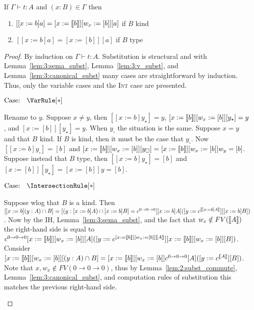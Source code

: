 \begin{lemma}
    \label{lem:3:subst}
    If $\Gamma \vdash t : A$ and $(x : B) \in \Gamma$ then
    \begin{enumerate}
        \item $[[x := b]a] = [x := \llbracket b \rrbracket][w_x := [b]][a]$ if $B$ kind
        \item $[[x := b]a] = [x := [b]][a]$ if $B$ type
    \end{enumerate}
\end{lemma}
\begin{proof}
    By induction on $\Gamma \vdash t : A$.
    Substitution is structural and with Lemma~\ref{lem:3:sema_subst}, Lemma~\ref{lem:3:v_subst}, and Lemma~\ref{lem:3:canonical_subst} many cases are straightforward by induction.
    Thus, only the variable cases and the \textsc{Int} case are presented.

    $\text{Case: }\begin{array}{c} \VarRule[*] \end{array}$
    \begin{proofcase}
        Rename to $y$.
        Suppose $x \neq y$, then $[[x := b]y_\star] = y$, $[x := \llbracket b \rrbracket][w_x := [b]][y_\star] = y$, and $[x := [b]][y_\star] = y$.
        When $y_\square$ the situation is the same.
        Suppose $x = y$ and that $B$ kind.
        If $B$ is kind, then it must be the case that $y_\square$.
        Now $[[x := b]y_\square] = [b]$ and  $[x := \llbracket b \rrbracket][w_x := [b]][y_\square] = [x := \llbracket b \rrbracket][w_x := [b]]w_y = [b]$.
        Suppose instead that $B$ type, then $[[x := b]y_\star] = [b]$ and $[x := [b]][y_\star] = [x := [b]]y = [b]$.
    \end{proofcase}

    $\text{Case: }\begin{array}{c} \IntersectionRule[*] \end{array}$
    \begin{proofcase}
        Suppose wlog that $B$ is a kind.
        Then $[[x := b](y : A) \cap B] = [(y : [x := b]A) \cap [x := b]B] = c^{0 \to 0 \to 0}[[x := b]A] ([y := c^{\llbracket [x := b]A \rrbracket}][[x := b]B])$.
        Now by the IH, Lemma~\ref{lem:3:sema_subst}, and the fact that $w_x \notin FV(\llbracket A \rrbracket)$ the right-hand side is equal to $c^{0 \to 0 \to 0}[x := \llbracket b \rrbracket][w_x := [b]][A] ([y := c^{[x := \llbracket b \rrbracket][w_x := [b]]\llbracket A \rrbracket}][x := \llbracket b \rrbracket][w_x := [b]][B])$.
        Consider $[x := \llbracket b \rrbracket][w_x := [b]][(y : A) \cap B] = [x := \llbracket b \rrbracket][w_x := [b]]c^{0 \to 0 \to 0}[A] ([y := c^{\llbracket A \rrbracket}][B])$.
        Note that $x, w_x \notin FV(0 \to 0 \to 0)$, thus by Lemma~\ref{lem:2:subst_commute}, Lemma~\ref{lem:3:canonical_subst}, and computation rules of substitution this matches the previous right-hand side.
    \end{proofcase}
\end{proof}

